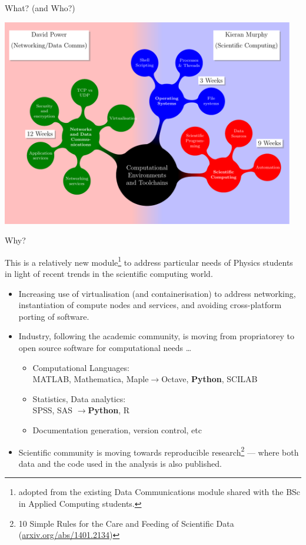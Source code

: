 \documentclass{wit-slides-2020}
\begin{document}
\begin{frame}{What? (and Who?)}
\vspace*{-2em}\begin{center}
\hspace*{-1.25em}\includegraphics[page=1,height=.9\paperheight, width=12.8cm]{../../../shared/mindmap/mindmaps}
\end{center}
\end{frame}

\begin{frame}[label=todo]{Why?}

This is a relatively new module\footnote{adopted from the existing Data Communications module shared with the BSc in Applied Computing students.} to address particular needs of Physics students in light of recent trends in the scientific computing world.
\begin{itemize}
\item
Increasing use of virtualisation (and containerisation) to address networking, instantiation of compute nodes and services, and avoiding cross-platform porting of software.
\item
Industry, following the academic community, is moving from propriatorey to open source software for computational needs \ldots
\begin{itemize}
\item 
Computational Languages: \\
MATLAB, Mathematica, Maple\hfill $\to$\hfill Octave, {\bf Python}, SCILAB
\item
Statistics, Data analytics:\\
SPSS, SAS \hfill$\to$\hfill {\bf Python}, R
\item
Documentation generation, version control, etc
\end{itemize}
\item
Scientific community is moving towards reproducible research\footnote{\scriptsize 10 Simple Rules for the Care and Feeding of Scientific Data (\url{arxiv.org/abs/1401.2134})}
 --- where both data and the code used in the analysis is also published.

\end{itemize}

\end{frame}
\end{document}
